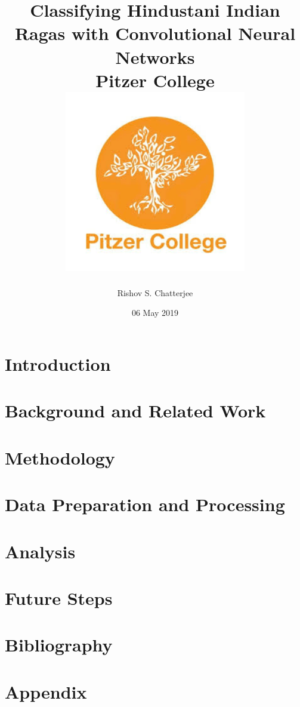 \documentclass[12pt]{report}
\title{
{Classifying Hindustani Indian Ragas with Convolutional Neural Networks}\\
{\large Pitzer College}\\
{\includegraphics{university_1.png}}
}
\author{Rishov S. Chatterjee}
\date{06 May 2019}
\begin{document}
\maketitle{}
\chapter{Introduction}


\chapter{Background and Related Work}


\chapter{Methodology}


\chapter{Data Preparation and Processing}


\chapter{Analysis}


\chapter{Future Steps}


\chapter{Bibliography}


\chapter{Appendix}

\end{document}
